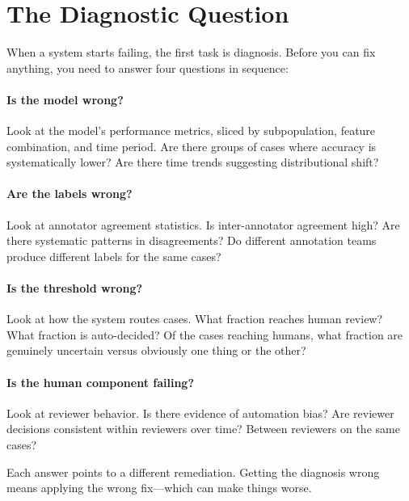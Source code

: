\section{The Diagnostic Question}
\label{sec:diagnostic-question}

When a \hitl system starts failing, the first task is diagnosis. Before you can fix anything, you need to answer four questions in sequence:

\paragraph{Is the model wrong?} Look at the model's performance metrics, sliced by subpopulation, feature combination, and time period. Are there groups of cases where accuracy is systematically lower? Are there time trends suggesting distributional shift?

\paragraph{Are the labels wrong?} Look at annotator agreement statistics. Is inter-annotator agreement high? Are there systematic patterns in disagreements? Do different annotation teams produce different labels for the same cases?

\paragraph{Is the threshold wrong?} Look at how the system routes cases. What fraction reaches human review? What fraction is auto-decided? Of the cases reaching humans, what fraction are genuinely uncertain versus obviously one thing or the other?

\paragraph{Is the human component failing?} Look at reviewer behavior. Is there evidence of automation bias? Are reviewer decisions consistent within reviewers over time? Between reviewers on the same cases?

Each answer points to a different remediation. Getting the diagnosis wrong means applying the wrong fix---which can make things worse.

